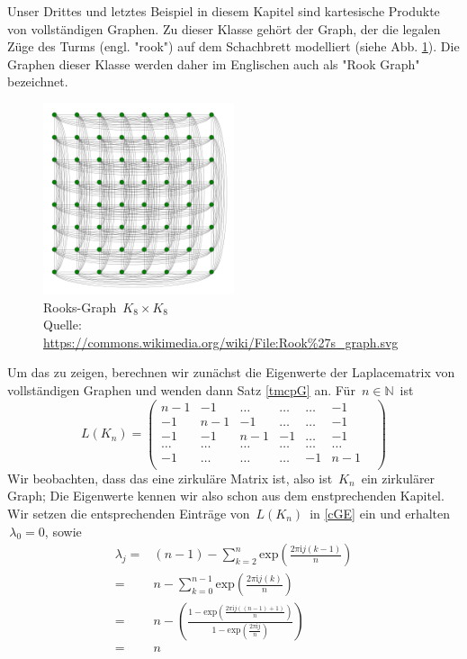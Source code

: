 \begin{Bsps}
\end{Bsps}
Unser Drittes und letztes Beispiel in diesem Kapitel sind kartesische Produkte von vollständigen Graphen. Zu dieser Klasse gehört der Graph, der die legalen Züge des Turms (engl. "rook") auf dem Schachbrett modelliert (siehe Abb. \ref{rook}). Die Graphen dieser Klasse werden daher im Englischen auch als "Rook Graph" bezeichnet.
\begin{figure}[H]
  \centering
 \includegraphics[width=0.5\textwidth]{Rook's_graph.png}
 \caption{Rooks-Graph $\,K_8\times K_8\,$ \\ \tiny{Quelle: \protect\url{https://commons.wikimedia.org/wiki/File:Rook\%27s_graph.svg}}}
 \label{rook} %
\end{figure}
Um das zu zeigen, berechnen wir zunächst die Eigenwerte der Laplacematrix von vollständigen Graphen und wenden dann Satz \ref{tmcpG} an.
Für $\,n \in \mathbb{N}\,$ ist
\begin{equation*}
L(K_n)=
\begin{pmatrix}
n-1&-1&\ldots&\ldots&\ldots&-1\\
-1&n-1&-1&\ldots&\ldots&-1\\
-1&-1&n-1&-1&\ldots&-1\\
\ldots&\ldots&\ldots&\ldots&\ldots&\ldots&\\
-1&\ldots&\ldots&\ldots&-1&n-1\\
\end{pmatrix}
\end{equation*}
Wir beobachten, dass das eine zirkuläre Matrix ist, also ist $\,K_n\,$ ein zirkulärer Graph;
Die Eigenwerte kennen wir also schon aus dem enstprechenden Kapitel. Wir setzen die entsprechenden Einträge von $\,L(K_n)\,$ in \ref{cGE} ein und erhalten $\,\lambda_0=0$,\; sowie
\begin{equation*}
\begin{split}
 \lambda_j = {} & (n-1) - \sum_{k=2}^{n}\mathrm{exp}{\left(\frac{2\pi \mathrm{i}j(k-1)}{n}\right)}\\
 ={} & n - \sum_{k=0}^{n-1}\mathrm{exp}{\left(\frac{2\pi \mathrm{i}j(k)}{n}\right)}\\
 ={} & n - \left( \frac{1-\mathrm{exp}{\left(\frac{2\pi \mathrm{i}j((n-1)+1)}{n}\right)}}{1-\mathrm{exp}{\left(\frac{2\pi \mathrm{i}j}{n}\right)}} \right)\\
 ={}&n
 \end{split}
\end{equation*}
